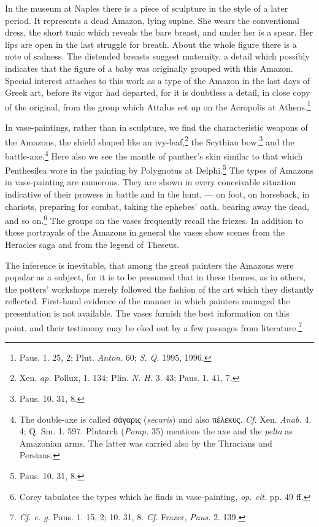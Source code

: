 \documentclass[a4paper, 12pt, oneside]{article}
\begin{document}
In the museum at Naples there is a piece of sculpture in the style of a later period. It represents a dead Amazon, lying supine. She wears the conventional dress, the short tunic which reveals the bare breast, and under her is a spear. Her lips are open in the last struggle for breath. About the whole figure there is a note of sadness. The distended breasts suggest maternity, a detail which possibly indicates that the figure of a baby was originally grouped with this Amazon. Special interest attaches to this work as a type of the Amazon in the last days of Greek art, before its vigor had departed, for it is doubtless a detail, in close copy of the original, from the group which Attalus set up on the Acropolis at Athens.\footnote{Paus. 1. 25, 2; Plut. \emph{Anton.} 60; \emph{S. Q.} 1995, 1996.}

In vase-paintings, rather than in sculpture, we find the characteristic weapons of the Amazons, the shield shaped like an ivy-leaf,\footnote{Xen. \emph{ap.} Pollux, 1. 134; Plin. \emph{N. H.} 3. 43; Paus. 1. 41, 7.} the Scythian bow,\footnote{Paus. 10. 31, 8.} and the battle-axe.\footnote{The double-axe is called σάγαρις (\emph{securis}) and also πέλεκυς. \emph{Cf.} Xen. \emph{Anab.} 4. 4; Q. Sm. 1. 597. Plutarch (\emph{Pomp.} 35) mentions the axe and the \emph{pelta} as Amazonian arms. The latter was carried also by the Thracians and Persians.} Here also we see the mantle of panther's skin similar to that which Penthesilea wore in the painting by Polygnotus at Delphi.\footnote{Paus. 10. 31, 8.} The types of Amazons in vase-painting are numerous. They are shown in every conceivable situation indicative of their prowess in battle and in the hunt, --- on foot, on horseback, in chariots, preparing for combat, taking the ephebes' oath, bearing away the dead, and so on.\footnote{Corey tabulates the types which he finds in vase-painting, \emph{op. cit.} pp. 49 ff.} The groups on the vases frequently recall the friezes. In addition to these portrayals of the Amazons in general the vases show scenes from the Heracles saga and from the legend of Theseus.

The inference is inevitable, that among the great painters the Amazons were popular as a subject, for it is to be presumed that in these themes, as in others, the potters' workshops merely followed the fashion of the art which they distantly reflected. First-hand evidence of the manner in which painters managed the presentation is not available. The vases furnish the best information on this point, and their testimony may be eked out by a few passages from literature.\footnote{\emph{Cf. e. g.} Paus. 1. 15, 2; 10. 31, 8. \emph{Cf.} Frazer, \emph{Paus.} 2. 139.}
\end{document}
